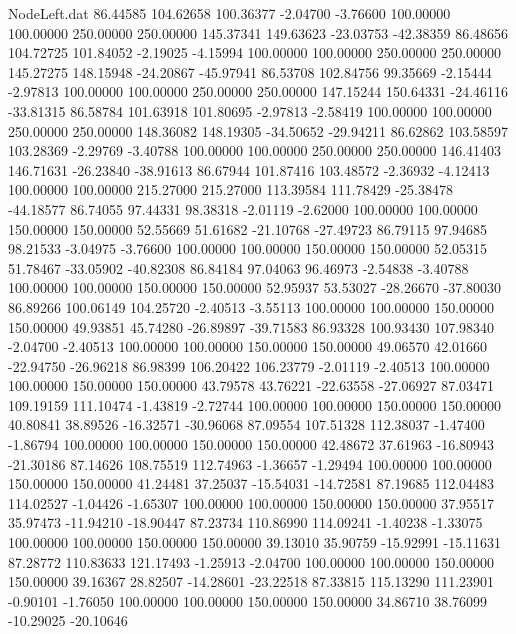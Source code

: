 \begin{filecontents}{NodeLeft.dat}
  86.44585  104.62658  100.36377    -2.04700   -3.76600  100.00000  100.00000  250.00000  250.00000  145.37341  149.63623  -23.03753  -42.38359
  86.48656  104.72725  101.84052    -2.19025   -4.15994  100.00000  100.00000  250.00000  250.00000  145.27275  148.15948  -24.20867  -45.97941
  86.53708  102.84756   99.35669    -2.15444   -2.97813  100.00000  100.00000  250.00000  250.00000  147.15244  150.64331  -24.46116  -33.81315
  86.58784  101.63918  101.80695    -2.97813   -2.58419  100.00000  100.00000  250.00000  250.00000  148.36082  148.19305  -34.50652  -29.94211
  86.62862  103.58597  103.28369    -2.29769   -3.40788  100.00000  100.00000  250.00000  250.00000  146.41403  146.71631  -26.23840  -38.91613
  86.67944  101.87416  103.48572    -2.36932   -4.12413  100.00000  100.00000  215.27000  215.27000  113.39584  111.78429  -25.38478  -44.18577
  86.74055   97.44331   98.38318    -2.01119   -2.62000  100.00000  100.00000  150.00000  150.00000   52.55669   51.61682  -21.10768  -27.49723
  86.79115   97.94685   98.21533    -3.04975   -3.76600  100.00000  100.00000  150.00000  150.00000   52.05315   51.78467  -33.05902  -40.82308
  86.84184   97.04063   96.46973    -2.54838   -3.40788  100.00000  100.00000  150.00000  150.00000   52.95937   53.53027  -28.26670  -37.80030
  86.89266  100.06149  104.25720    -2.40513   -3.55113  100.00000  100.00000  150.00000  150.00000   49.93851   45.74280  -26.89897  -39.71583
  86.93328  100.93430  107.98340    -2.04700   -2.40513  100.00000  100.00000  150.00000  150.00000   49.06570   42.01660  -22.94750  -26.96218
  86.98399  106.20422  106.23779    -2.01119   -2.40513  100.00000  100.00000  150.00000  150.00000   43.79578   43.76221  -22.63558  -27.06927
  87.03471  109.19159  111.10474    -1.43819   -2.72744  100.00000  100.00000  150.00000  150.00000   40.80841   38.89526  -16.32571  -30.96068
  87.09554  107.51328  112.38037    -1.47400   -1.86794  100.00000  100.00000  150.00000  150.00000   42.48672   37.61963  -16.80943  -21.30186
  87.14626  108.75519  112.74963    -1.36657   -1.29494  100.00000  100.00000  150.00000  150.00000   41.24481   37.25037  -15.54031  -14.72581
  87.19685  112.04483  114.02527    -1.04426   -1.65307  100.00000  100.00000  150.00000  150.00000   37.95517   35.97473  -11.94210  -18.90447
  87.23734  110.86990  114.09241    -1.40238   -1.33075  100.00000  100.00000  150.00000  150.00000   39.13010   35.90759  -15.92991  -15.11631
  87.28772  110.83633  121.17493    -1.25913   -2.04700  100.00000  100.00000  150.00000  150.00000   39.16367   28.82507  -14.28601  -23.22518
  87.33815  115.13290  111.23901    -0.90101   -1.76050  100.00000  100.00000  150.00000  150.00000   34.86710   38.76099  -10.29025  -20.10646

\end{filecontents}
